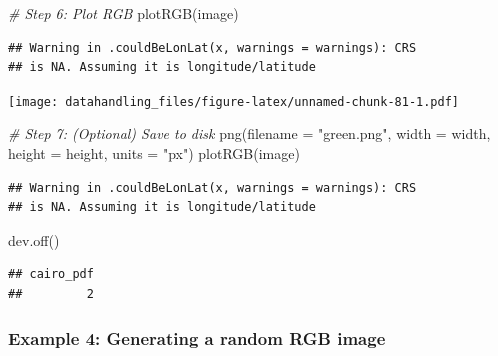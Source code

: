 \documentclass[
  12pt,
]{style/krantz}
\newenvironment{Shaded}{\begin{snugshade}}{\end{snugshade}}
\newcommand{\AttributeTok}[1]{\textcolor[rgb]{0.77,0.63,0.00}{#1}}
\newcommand{\CommentTok}[1]{\textcolor[rgb]{0.56,0.35,0.01}{\textit{#1}}}
\newcommand{\FunctionTok}[1]{\textcolor[rgb]{0.00,0.00,0.00}{#1}}
\newcommand{\NormalTok}[1]{#1}
\newcommand{\StringTok}[1]{\textcolor[rgb]{0.31,0.60,0.02}{#1}}
\begin{document}
\begin{Shaded}
\begin{Highlighting}[]
\CommentTok{\# Step 6: Plot RGB}
\FunctionTok{plotRGB}\NormalTok{(image)}
\end{Highlighting}
\end{Shaded}

\begin{verbatim}
## Warning in .couldBeLonLat(x, warnings = warnings): CRS
## is NA. Assuming it is longitude/latitude
\end{verbatim}

\texttt{[image: datahandling\_files/figure-latex/unnamed-chunk-81-1.pdf]}

\begin{Shaded}
\begin{Highlighting}[]
\CommentTok{\# Step 7: (Optional) Save to disk}
\FunctionTok{png}\NormalTok{(}\AttributeTok{filename =} \StringTok{"green.png"}\NormalTok{, }\AttributeTok{width =}\NormalTok{ width, }\AttributeTok{height =}\NormalTok{ height, }\AttributeTok{units =} \StringTok{"px"}\NormalTok{)}
\FunctionTok{plotRGB}\NormalTok{(image)}
\end{Highlighting}
\end{Shaded}

\begin{verbatim}
## Warning in .couldBeLonLat(x, warnings = warnings): CRS
## is NA. Assuming it is longitude/latitude
\end{verbatim}

\begin{Shaded}
\begin{Highlighting}[]
\FunctionTok{dev.off}\NormalTok{()}
\end{Highlighting}
\end{Shaded}

\begin{verbatim}
## cairo_pdf 
##         2
\end{verbatim}

\hypertarget{example-4-generating-a-random-rgb-image}{%
\subsubsection{Example 4: Generating a random RGB image}\label{example-4-generating-a-random-rgb-image}}
\end{document}
